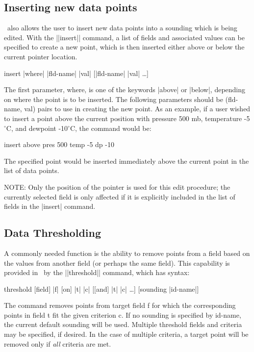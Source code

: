 \subsection{Inserting new data points}
\Suds\ also allows the user to insert new data points into a sounding 
which is being edited.  With the ||insert|| command, a list of fields and
associated values can be specified to create a new point, which is then 
inserted either above or below the current pointer location.
\begin{example}
	insert |where| |fld-name| |val| [|fld-name| |val| \ldots]
\end{example}
The first parameter, {\pf where}, is one of the keywords |above| or |below|, 
depending on where the point is to be inserted.  The following parameters 
should be ({\pf fld-name}, {\pf val}) pairs to use in creating the new 
point.  As an example, if a user wished to insert a point above the current 
position with pressure 500 mb, temperature -5$^\circ$C, and dewpoint 
-10$^\circ$C, the command would be:
\begin{example}
	insert above pres 500 temp -5 dp -10
\end{example}
The specified point would be inserted immediately above the current point 
in the list of data points.  

NOTE: Only the position of the pointer is used for this edit procedure; the
currently selected field is only affected if it is explicitly included in 
the list of fields in the |insert| command.

\subsection{Data Thresholding}
A commonly needed function is the ability to remove points from a field based
on the values from another field (or perhaps the same field).  This capability
is provided in \suds\ by the ||threshold|| command, which has syntax:
\begin{example}
	threshold [field] |f| [on] |t| |c| [[and] |t| |c| \ldots] [sounding |id-name|]
\end{example}
The command removes points from target field {\pf f} for which the
corresponding points in field {\pf t} fit the given criterion {\pf c}.
If no sounding is specified by {\pf id-name}, the current default sounding
will be used.  Multiple threshold fields and criteria may be specified, if
desired.  In the case of multiple criteria, a target point will be removed
only if {\it all} criteria are met.

